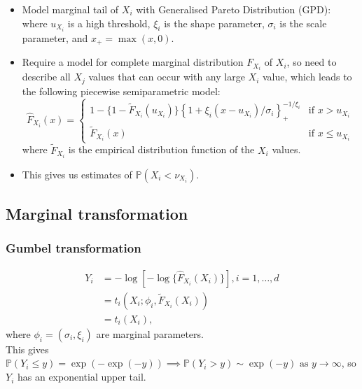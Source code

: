 \documentclass{article}
\numberwithin{equation}{section}
\begin{document}
\begin{itemize}
  \item Model marginal tail of $X_i$ with Generalised Pareto Distribution (GPD):
    where $u_{X_i}$ is a high threshold, $\xi_i$ is the shape parameter, $\sigma_i$ is the scale parameter, and ${x}_{+} = \max(x, 0)$.
  \item Require a model for complete marginal distribution $F_{X_i}$  of $X_i$, so need to describe all $X_j$ values that can occur with any large $X_i$ value, which leads to the following piecewise semiparametric model:
    \[
      \hat{F}_{X_i}(x) = \begin{cases}
        1 - \{ 1 - \tilde{F}_{X_i}(u_{X_i})\} \left\{1 + \xi_i(x - u_{X_i})/\sigma_i\right\}_{+}^{-1/\xi_i} & \text{if } x > u_{X_i} \\
        \tilde{F}_{X_i}(x) & \text{if } x \le u_{X_i}
      \end{cases}
    \]
    where $\tilde{F}_{X_i}$ is the empirical distribution function of the $X_i$ values. 
  \item This gives us estimates of $\mathbb{P}(X_i < \nu_{X_i})$.
\end{itemize}

\subsection{Marginal transformation}


\subsubsection{Gumbel transformation}

\begin{align*}
  Y_i &= -\log[-\log\{\hat{F}_{X_i}(X_i)\}], i = 1, \ldots, d \\
      &= t_i(X_i; \phi_i, \tilde{F}_{X_i}(X_i)) \\
      &= t_i(X_i),
\end{align*}
where $\phi_i = (\sigma_i, \xi_i)$ are marginal parameters. \\
This gives $\mathbb{P}(Y_i \le y) = \exp(-\exp(-y)) \implies \mathbb{P}(Y_i > y) \sim \exp(-y) \text{ as } y \rightarrow \infty$, so $Y_i$ has an exponential upper tail. 
\end{document}
